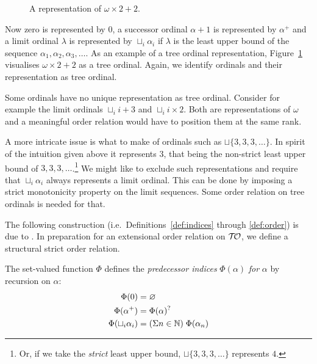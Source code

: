 \begin{figure}
\begin{center}
\begin{tikzpicture}

\end{tikzpicture}
\end{center}
\caption{A representation of $\omega \times 2 + 2$.}\label{fig:tree}
\end{figure}

Now zero is represented by $0$, a successor ordinal $\alpha +1$ is represented
by $\alpha^+$ and a limit ordinal $\lambda$ is represented by $\sqcup_i
\alpha_i$ if $\lambda$ is the least upper bound of the sequence $\alpha_1,
\alpha_2, \alpha_3, \ldots$. As an example of a tree ordinal representation,
Figure~\ref{fig:tree} visualises $\omega \times 2 + 2$ as a tree
ordinal. Again, we identify ordinals and their representation as tree
ordinal.

Some ordinals have no unique representation as tree ordinal. Consider for
example the limit ordinals $\sqcup_i i + 3$ and $\sqcup_i i \times 2$. Both
are representations of $\omega$ and a meaningful order relation would
have to position them at the same rank.

A more intricate issue is what to make of ordinals such as $\sqcup \{
3, 3, 3, \ldots \}$. In spirit of the intuition given above it
represents $3$, that being the non-strict least upper bound of $3, 3,
3, \ldots$.\footnote{Or, if we take the \emph{strict} least upper bound, $\sqcup \{
3, 3, 3, \ldots \}$ represents $4$.}
We might like to exclude such representations and require that
$\sqcup_i \alpha_i$ always represents a limit ordinal. This can be
done by imposing a strict monotonicity property on the limit
sequences. Some order relation on tree ordinals is needed for that.

The following construction (i.e.\ Definitions~\ref{def:indices}
through \ref{def:order}) is due to \citet{hancock-08}. In preparation
for an extensional order relation on $\Ord$, we define a structural
strict order relation.

\begin{definition}\label{def:indices}%
The set-valued function $\Phi$ defines the \emph{predecessor indices}
$\Phi(\alpha)$ \emph{for} $\alpha$ by recursion on $\alpha$:
\begin{align*}
  \Phi(0)                 &= \nothing \\
  \Phi(\alpha^+)          &= \Phi(\alpha)^? \\
  \Phi(\sqcup_i \alpha_i) &= (\Sigma n \in \mathbb{N}) \; \Phi(\alpha_n)
\end{align*}
\end{definition}

